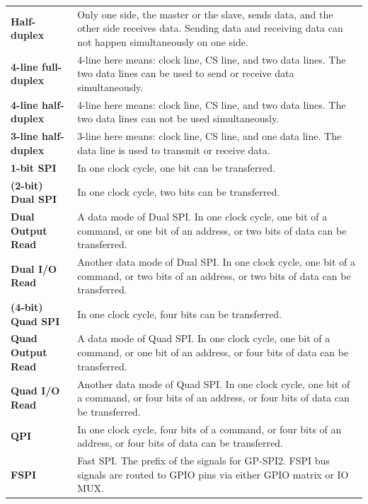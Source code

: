\begin{longtable}[c]{ R{7cm} p{10cm} }
\textbf{Half-duplex} & Only one side, the master or the slave, sends data, and the other side receives data. Sending data and receiving data can not happen simultaneously on one side.\\
\textbf{4-line full-duplex} & 4-line here means: clock line, CS line, and two data lines. The two data lines can be used to send or receive data simultaneously.\\
\textbf{4-line half-duplex} & 4-line here means: clock line, CS line, and two data lines. The two data lines can not be used simultaneously.\\
\textbf{3-line half-duplex} & 3-line here means: clock line, CS line, and one data line. The data line is used to transmit or receive data. \\
\textbf{1-bit SPI} & In one clock cycle, one bit can be transferred.\\
\textbf{(2-bit) Dual SPI} & In one clock cycle, two bits can be transferred. \\
\textbf{Dual Output Read} & A data mode of Dual SPI. In one clock cycle, one bit of a command, or one bit of an address, or two bits of data can be transferred.\\
\textbf{Dual I/O Read} & Another data mode of Dual SPI. In one clock cycle, one bit of a command, or two bits of an address, or two bits of data can be transferred.\\
\textbf{(4-bit) Quad SPI} & In one clock cycle, four bits can be transferred. \\
\textbf{Quad Output Read} & A data mode of Quad SPI. In one clock cycle, one bit of a command, or one bit of an address, or four bits of data can be transferred.\\
\textbf{Quad I/O Read} & Another data mode of Quad SPI. In one clock cycle, one bit of a command, or four bits of an address, or four bits of data can be transferred.\\
\textbf{QPI} & In one clock cycle, four bits of a command, or four bits of an address, or four bits of data can be transferred.\\
\textbf{FSPI} & Fast SPI. The prefix of the signals for GP-SPI2. FSPI bus signals are routed to GPIO pins via either GPIO matrix or IO MUX.\\
\end{longtable}
